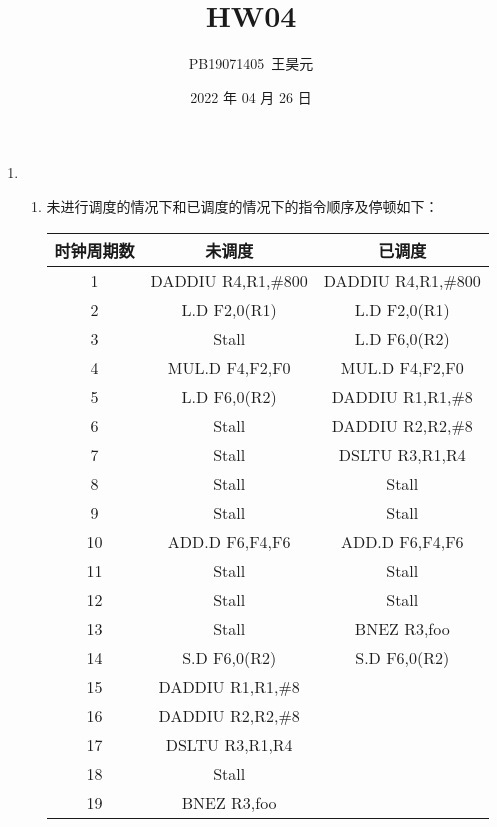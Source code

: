 \documentclass{article}
\title{HW04}
\author{PB19071405\ 王昊元}
\date{2022 年 04 月 26 日}
\begin{document}
    \maketitle

    \begin{enumerate}[label=\arabic*.]
        \item \begin{enumerate}[label=\alph*.]
            \item 未进行调度的情况下和已调度的情况下的指令顺序及停顿如下：\\
            \begin{table}[H]
                \centering
                \begin{tabular}{ccc}
                    \hline
                    时钟周期数 & 未调度 & 已调度 \\
                    \hline
                    1 & DADDIU R4,R1,\#800 & DADDIU R4,R1,\#800 \\
                    2 & L.D F2,0(R1) & L.D F2,0(R1) \\
                    3 & Stall & L.D F6,0(R2) \\
                    4 & MUL.D F4,F2,F0 & MUL.D F4,F2,F0 \\
                    5 & L.D F6,0(R2) & DADDIU R1,R1,\#8 \\
                    6 & Stall & DADDIU R2,R2,\#8 \\
                    7 & Stall & DSLTU R3,R1,R4 \\
                    8 & Stall & Stall \\
                    9 & Stall & Stall \\
                    10 & ADD.D F6,F4,F6 & ADD.D F6,F4,F6 \\
                    11 & Stall & Stall \\
                    12 & Stall & Stall \\
                    13 & Stall & BNEZ R3,foo \\
                    14 & S.D F6,0(R2) & S.D F6,0(R2) \\
                    15 & DADDIU R1,R1,\#8 & ~ \\
                    16 & DADDIU R2,R2,\#8 & ~ \\
                    17 & DSLTU R3,R1,R4 & ~ \\
                    18 & Stall & ~ \\
                    19 & BNEZ R3,foo & ~ \\

\end{tabular}
\end{table}
\end{enumerate}
\end{enumerate}
\end{document}
